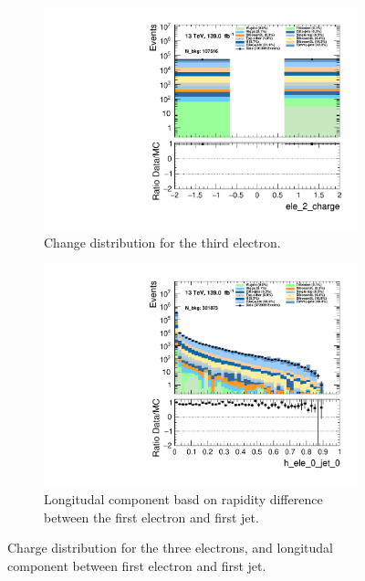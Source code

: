 \begin{figure}
\begin{subfigure}{.49\textwidth}
        \includegraphics[width=\textwidth]{Figures/MC_Data_comp/ele_2_charge.pdf}
        \caption{Change distribution for the third electron. }
        \label{fig:ele_2_charge}
    \end{subfigure}
    \hfill
    \begin{subfigure}{.49\textwidth}
        \includegraphics[width=\textwidth]{Figures/MC_Data_comp/h_ele_0_jet_0.pdf}
        \caption{ Longitudal component basd on rapidity difference between the first electron and first jet.}
        \label{fig:h_ele_0_jet_0}
    \end{subfigure}
    \hfill       
    \caption{Charge distribution for the three electrons, and longitudal component between first electron and first jet. }
    \label{fig:batch3_feats}
\end{figure}

